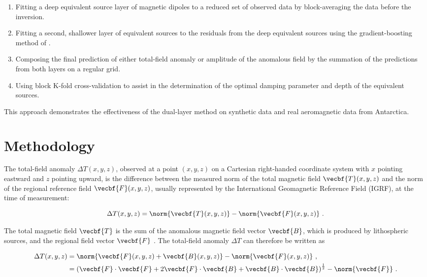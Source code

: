 \begin{enumerate}
  \item Fitting a deep equivalent source layer of magnetic dipoles to a reduced set of observed data by block-averaging the data before the inversion.
  \item Fitting a second, shallower layer of equivalent sources to the residuals from the deep equivalent sources using the gradient-boosting method of \citet{Soler2021}.
  \item Composing the final prediction of either total-field anomaly or amplitude of the anomalous field by the summation of the predictions from both layers on a regular grid.
  \item Using block K-fold cross-validation to assist in the determination of the optimal damping parameter and depth of the equivalent sources.
\end{enumerate}

\noindent
This approach demonstrates the effectiveness of the dual-layer method on synthetic data and real aeromagnetic data from Antarctica.


\section{Methodology}

The total-field anomaly $\Delta T(x, y, z)$, observed at a point $(x, y, z)$ on a Cartesian right-handed coordinate system with $x$ pointing eastward and $z$ pointing upward, is the difference between the measured norm of the total magnetic field $\vecbf{T}(x, y, z)$ and the norm of the regional reference field $\vecbf{F}(x, y, z)$, usually represented by the International Geomagnetic Reference Field (IGRF), at the time of measurement:

\begin{equation}
    \Delta T(x, y, z) =
    \norm{\vecbf{T}(x, y, z)}
    - \norm{\vecbf{F}(x, y, z)}
    \ .
\end{equation}

\noindent
The total magnetic field $\vecbf{T}$ is the sum of the anomalous magnetic field vector $\vecbf{B}$, which is produced by lithospheric sources, and the regional field vector $\vecbf{F}$ \citep{Blakley1995, Langel1998, OliveiraJr2015}. The total-field anomaly $\Delta T$ can therefore be written as

\begin{align}
    \label{eq:tfa-definition}
    \Delta T(x, y, z) &=
    \norm{\vecbf{F}(x, y, z) + \vecbf{B}(x, y, z)} - \norm{\vecbf{F}(x, y, z)}\ ,
    \\
    &= \left(
        \vecbf{F} \cdot \vecbf{F}
        + 2\vecbf{F} \cdot \vecbf{B}
        + \vecbf{B} \cdot \vecbf{B}
        \right)^{\frac{1}{2}}
    - \norm{\vecbf{F}}
    \ .
\end{align}

